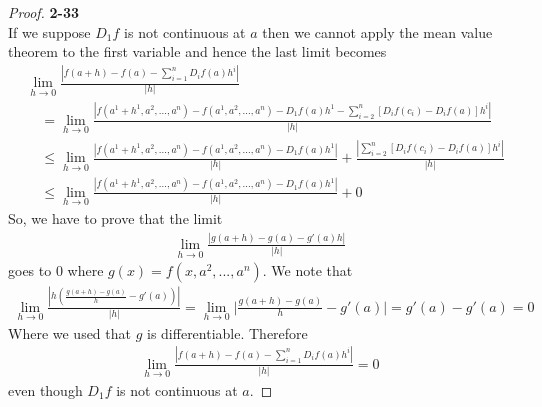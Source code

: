 \documentclass[11pt]{article}
\theoremstyle{definition}
\begin{document}
\cleardoublepage
\begin{proof}{\textbf{2-33}}\\
If we suppose $D_1f$ is not continuous at $a$ then we cannot apply the mean
value theorem to the first variable and hence the last limit becomes
\begin{align*}
    &\lim_{h\to 0} \frac{|f(a + h) - f(a) - \sum_{i=1}^n D_if(a) h^i|}{|h|}\\
    &\quad= \lim_{h\to 0}
    \frac{|f(a^1 + h^1, a^2, ..., a^n) - f(a^1, a^2, ..., a^n)
    - D_1f(a)h^1 - \sum_{i=2}^n [D_if(c_i) - D_if(a)] h^i|}{|h|}\\
    &\quad\leq \lim_{h\to 0}
    \frac{|f(a^1 + h^1, a^2, ..., a^n) - f(a^1, a^2, ..., a^n) - D_1f(a) h^1|}{|h|}
    + \frac{|\sum_{i=2}^n [D_if(c_i) - D_if(a)] h^i|}{|h|}\\
    &\quad\leq \lim_{h\to 0}
    \frac{|f(a^1 + h^1, a^2, ..., a^n) - f(a^1, a^2, ..., a^n) - D_1f(a) h^1|}{|h|} + 0
\end{align*}
So, we have to prove that the limit
\begin{align*}
    \lim_{h \to 0}\frac{|g(a + h) - g(a) - g'(a) h|}{|h|}
\end{align*}
goes to 0 where $g(x) = f(x, a^2, ..., a^n)$. We note that
\begin{align*}
    \lim_{h \to 0}\frac{|h(\frac{g(a + h) - g(a)}{h} - g'(a))|}{|h|}
    = \lim_{h \to 0} \bigg|\frac{g(a + h) - g(a)}{h} - g'(a)\bigg|
    = g'(a) - g'(a) 
    = 0
\end{align*}
Where we used that $g$ is differentiable. Therefore
\begin{align*}
    \lim_{h\to 0} \frac{|f(a + h) - f(a) - \sum_{i=1}^n D_if(a) h^i|}{|h|} = 0
\end{align*}
even though $D_1f$ is not continuous at $a$.
\end{proof}
\end{document}
